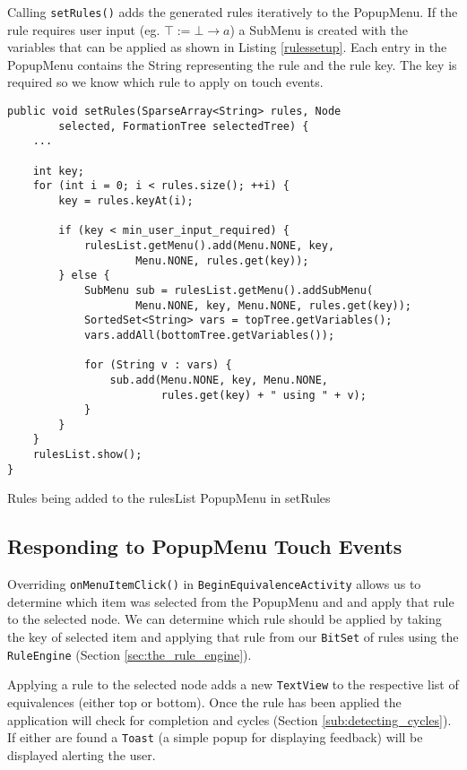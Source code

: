 \documentclass{report}
\begin{document}
Calling {\tt setRules()} adds the generated rules iteratively to the PopupMenu. If the rule requires user input (eg. $\top := \bot \to a$) a SubMenu is created with the variables that can be applied as shown in Listing \ref{rulessetup}. Each entry in the PopupMenu contains the String representing the rule and the rule key. The key is required so we know which rule to apply on touch events.

\begin{listing}[ht]
\begin{verbatim}
public void setRules(SparseArray<String> rules, Node 
        selected, FormationTree selectedTree) {
    ...

    int key;
    for (int i = 0; i < rules.size(); ++i) {
        key = rules.keyAt(i);

        if (key < min_user_input_required) {
            rulesList.getMenu().add(Menu.NONE, key, 
                    Menu.NONE, rules.get(key));
        } else {
            SubMenu sub = rulesList.getMenu().addSubMenu(
                    Menu.NONE, key, Menu.NONE, rules.get(key));
            SortedSet<String> vars = topTree.getVariables();
            vars.addAll(bottomTree.getVariables());

            for (String v : vars) {
                sub.add(Menu.NONE, key, Menu.NONE, 
                        rules.get(key) + " using " + v);
            }
        }
    }
    rulesList.show();
}
\end{verbatim}
\caption{Rules being added to the rulesList PopupMenu in setRules}
\label{rulessetup}
\end{listing}

\subsection{Responding to PopupMenu Touch Events}
\label{sub:responding_to_popupmenu_touch_events}

Overriding {\tt onMenuItemClick()} in {\tt BeginEquivalenceActivity} allows us to determine which item was selected from the PopupMenu and and apply that rule to the selected node. We can determine which rule should be applied by taking the key of selected item and applying that rule from our {\tt BitSet} of rules using the {\tt RuleEngine} (Section \ref{sec:the_rule_engine}).

Applying a rule to the selected node adds a new {\tt TextView} to the respective list of equivalences (either top or bottom). Once the rule has been applied the application will check for completion and cycles (Section \ref{sub:detecting_cycles}). If either are found a {\tt Toast} (a simple popup for displaying feedback) will be displayed alerting the user.
\end{document}
